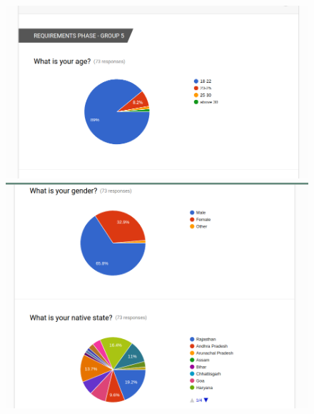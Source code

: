 \documentclass[]{article}
\begin{document}
\newpage
\begin{figure}
  \includegraphics[width=\linewidth]{1.png}  
  \includegraphics[width=\linewidth]{2.png}
 
   \end{figure}
\end{document}
